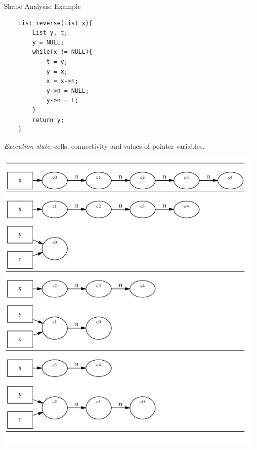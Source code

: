 \documentclass[aspectratio=1610, 13pt]{beamer}
\begin{document}
\begin{frame}[fragile]{Shape Analysis: Example}
\begin{multicols}{2}
\begin{example}
    \begin{lstlisting}
    List reverse(List x){
        List y, t;
        y = NULL;
        while(x != NULL){
            t = y;
            y = x;
            x = x->n;
            y->n = NULL;
            y->n = t;
        }
        return y;
    }
    \end{lstlisting}
\end{example}
\emph{Execution state}: cells, connectivity and values of pointer variables.
\begin{center}
    \includegraphics[scale=0.3]{shape_list.png}
\end{center}
\end{multicols}

    
\end{frame}
\end{document}
